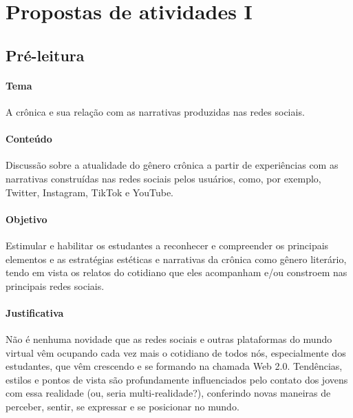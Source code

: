 \documentclass[12pt]{extarticle}
\begin{document}
\tableofcontents


\section{Propostas de atividades I}


\subsection{Pré-leitura}

\paragraph{Tema} A crônica e sua relação com as narrativas produzidas nas
  redes sociais.


\paragraph{Conteúdo} Discussão sobre a atualidade do gênero crônica a
partir de experiências com as narrativas construídas nas redes sociais
pelos usuários, como, por exemplo, Twitter, Instagram, TikTok e YouTube.

\paragraph{Objetivo} Estimular e habilitar os estudantes a reconhecer e
compreender os principais elementos e as estratégias estéticas e
narrativas da crônica como gênero literário, tendo em vista os relatos
do cotidiano que eles acompanham e/ou constroem nas principais redes
sociais.

\paragraph{Justificativa} Não é nenhuma novidade que as redes sociais e
outras plataformas do mundo virtual vêm ocupando cada vez mais o
cotidiano de todos nós, especialmente dos estudantes, que vêm crescendo
e se formando na chamada Web 2.0. Tendências, estilos e pontos de vista
são profundamente influenciados pelo contato dos jovens com essa
realidade (ou, seria multi-realidade?), conferindo novas maneiras de
perceber, sentir, se expressar e se posicionar no mundo.
\end{document}
